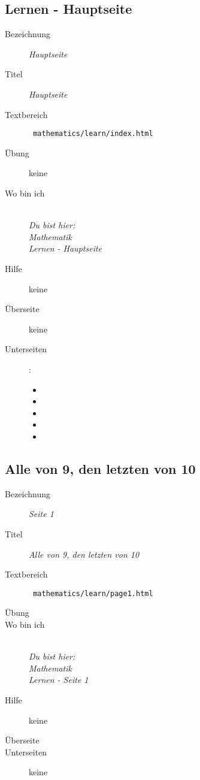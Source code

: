\subsection{ Lernen - Hauptseite }
\label{cha:math-learn-page0}
\begin{description}
  \item[Bezeichnung] \emph{ Hauptseite }
  \item[Titel] \emph{ Hauptseite }
  \item[Textbereich] \texttt{ mathematics/learn/index.html }
  \item[Übung] keine
  \item[Wo bin ich] \emph{\\Du bist hier:\\Mathematik\\Lernen - Hauptseite}
  \item[Hilfe] keine
  \item[Überseite] keine
  \item[Unterseiten] :
  \begin{itemize}
    \item {}
    \item {}
    \item {}
    \item {}
    \item {}
  \end{itemize}
\end{description}


\subsection{ Alle von 9, den letzten von 10 }
\label{cha:math-learn-page1}
\begin{description}
  \item[Bezeichnung] \emph{ Seite 1 }
  \item[Titel] \emph{ Alle von 9, den letzten von 10 }
  \item[Textbereich] \texttt{ mathematics/learn/page1.html }
  \item[Übung] 
  \item[Wo bin ich] \emph{\\Du bist hier:\\Mathematik\\Lernen - Seite 1 }
  \item[Hilfe] keine
  \item[Überseite] 
  \item[Unterseiten] keine
\end{description}



